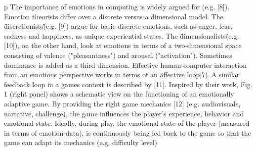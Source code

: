 p The importance of emotions in computing is widely argued for (e.g. [8]). Emotion theorists differ over a discrete versus a dimensional model. The \"discretionists\" (e.g. [9]) argue for basic discrete emotions, such as anger, fear, sadness and happiness, as unique experiential states. The \"dimensionalists\" (e.g. [10]), on the other hand, look at emotions in terms of a two-dimensional space consisting of valence ("pleasantness") and arousal ("activation"). Sometimes dominance is added as a third dimension.  Effective human-computer interaction from an emotions perspective works in terms of an \"affective loop\" [7]. A similar feedback loop in a games context is described by [11]. Inspired by their work, Fig. 1 (right panel) shows a schematic view on the functioning of an emotionally adaptive game. By providing the right game mechanics [12] (e.g. audiovisuals, narrative, challenge), the game influences the player's experience, behavior and emotional state. Ideally, during play, the emotional state of the player (measured in terms of emotion-data), is continuously being fed back to the game so that the game can adapt its mechanics (e.g. difficulty level)
